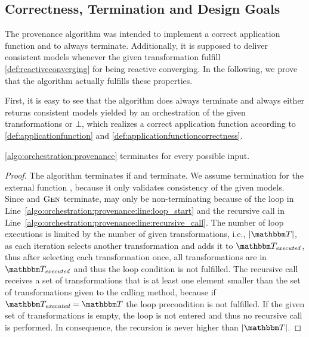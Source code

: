 \subsection{Correctness, Termination and Design Goals}

The provenance algorithm was intended to implement a correct application function and to always terminate.
Additionally, it is supposed to deliver consistent models whenever the given transformation fulfill \autoref{def:reactiveconverging} for being reactive converging.
In the following, we prove that the algorithm actually fulfills these properties.

First, it is easy to see that the algorithm does always terminate and always either returns consistent models yielded by an orchestration of the given transformations or $\bot$, which realizes a correct application function according to \autoref{def:applicationfunction} and \autoref{def:applicationfunctioncorrectness}.

\begin{theorem}
    \autoref{algo:orchestration:provenance} terminates for every possible input.
\end{theorem}
\begin{proof}
    The algorithm terminates if  and  terminate.
    We assume termination for the external function , because it only validates consistency of the given models.
    Since  and $\textsc{Gen}_{}$ terminate,  may only be non-terminating because of the loop in Line~\ref{algo:orchestration:provenance:line:loop_start} and the recursive call in Line~\ref{algo:orchestration:provenance:line:recursive_call}.
    The number of loop executions is limited by the number of given transformations, i.e., $\abs{\transformationset{T}}$, as each iteration selects another transformation and adds it to $\provalgexecuted$, thus after selecting each transformation once, all transformations are in $\provalgexecuted$ and thus the loop condition is not fulfilled.
    The recursive call receives a set of transformations that is at least one element smaller than the set of transformations given to the calling method, because if $\provalgexecuted = \transformationset{T}$ the loop precondition is not fulfilled. If the given set of transformations is empty, the loop is not entered and thus no recursive call is performed. In consequence, the recursion is never higher than $\abs{\transformationset{T}}$.
\end{proof}

